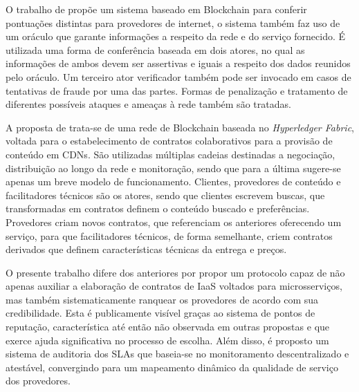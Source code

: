 O trabalho de \cite{blockchain:blockchain_as} propõe um sistema baseado em Blockchain para conferir pontuações distintas para provedores de internet, o sistema também faz uso de um oráculo que garante informações a respeito da rede e do serviço fornecido. É utilizada uma forma de conferência baseada em dois atores, no qual as informações de ambos devem ser assertivas e iguais a respeito dos dados reunidos pelo oráculo. Um terceiro ator verificador também pode ser invocado em casos de tentativas de fraude por uma das partes. Formas de penalização e tratamento de diferentes possíveis ataques e ameaças à rede também são tratadas.

A proposta de  trata-se de uma rede de Blockchain baseada no \textit{Hyperledger Fabric}, voltada para o estabelecimento de contratos colaborativos para a provisão de conteúdo em \acp{CDN}. São utilizadas múltiplas cadeias destinadas a negociação, distribuição ao longo da rede e monitoração, sendo que para a última sugere-se apenas um breve modelo de funcionamento. Clientes, provedores de conteúdo e facilitadores técnicos são os atores, sendo que clientes escrevem buscas, que transformadas em contratos definem o conteúdo buscado e preferências. Provedores criam novos contratos, que referenciam os anteriores oferecendo um serviço, para que facilitadores técnicos, de forma semelhante, criem contratos derivados que definem características técnicas da entrega e preços.

%
O presente trabalho difere dos anteriores por propor um protocolo capaz de não apenas auxiliar a elaboração de contratos de \ac{IaaS} voltados para microsserviços, mas também sistematicamente ranquear os provedores de acordo com sua credibilidade. Esta é publicamente visível graças ao sistema de pontos de reputação, característica até então não observada em outras propostas e que exerce ajuda significativa no processo de escolha. Além disso, é proposto um sistema de auditoria dos \acp{SLA} que baseia-se no monitoramento descentralizado e atestável, convergindo para um mapeamento dinâmico da qualidade de serviço dos provedores. 